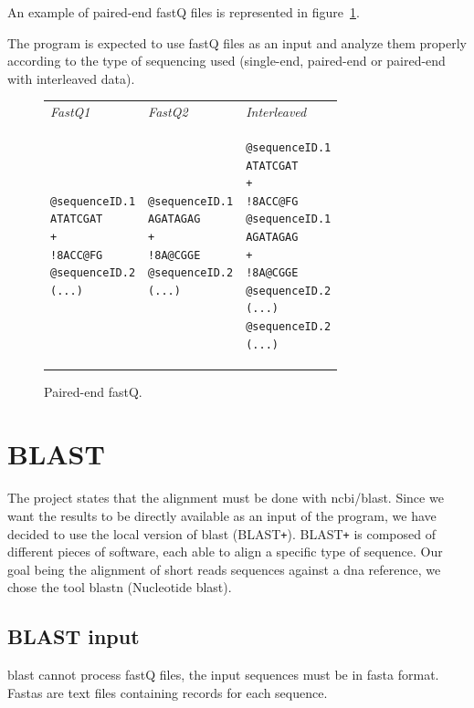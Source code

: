 An example of paired-end fastQ files is represented in figure~\ref{fig:pairedFastq}.

The program is expected to use fastQ files as an input and analyze them properly according to the type of sequencing used (single-end, paired-end or paired-end with interleaved data).

\begin{figure}[H]
\lstset{
    basicstyle=\ttfamily\small,
    frameround=ftft,
    frame=trBL}
\begin{tabular}{P P || P}
\emph{FastQ1} & \emph{FastQ2} & \emph{Interleaved}\tabularnewline
\begin{minipage}[t]{0.2\textwidth}
\begin{lstlisting}
@sequenceID.1
ATATCGAT
+
!8ACC@FG
@sequenceID.2
(...)
\end{lstlisting}
\end{minipage}
&
\begin{minipage}[t]{0.2\textwidth}
\begin{lstlisting}
@sequenceID.1
AGATAGAG
+
!8A@CGGE
@sequenceID.2
(...)
\end{lstlisting}
\end{minipage}
&
\begin{minipage}[t]{0.2\textwidth}
\begin{lstlisting}
@sequenceID.1
ATATCGAT
+
!8ACC@FG
@sequenceID.1
AGATAGAG
+
!8A@CGGE
@sequenceID.2
(...)
@sequenceID.2
(...)
\end{lstlisting}
\end{minipage}
\end{tabular}
\caption{Paired-end fastQ.}
\label{fig:pairedFastq}
\end{figure}


\section{BLAST}
The project states that the alignment must be done with \gls{ncbi}\slash\gls{blast}.
Since we want the results to be directly available as an input of the program, we have decided to use the local version of \gls{blast} (BLAST\texttt{+}).
BLAST\texttt{+} is composed of different pieces of software, each able to align a specific type of sequence.
Our goal being the alignment of short reads sequences against a \gls{dna} reference, we chose the tool blastn (Nucleotide \gls{blast}).


\subsection{BLAST input}
\label{subsec:blastinput}
\gls{blast} cannot process fastQ files, the input sequences must be in fasta format.
Fastas are text files containing records for each sequence.

